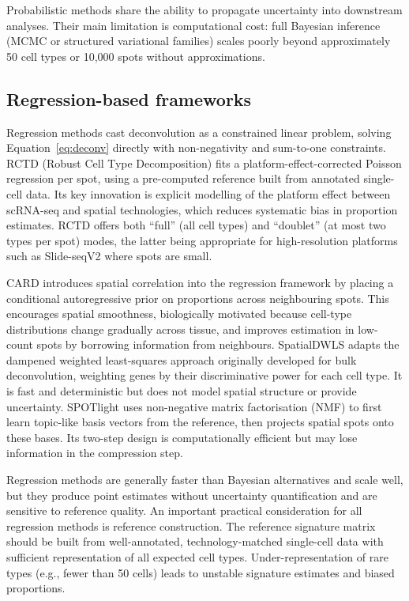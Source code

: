 Probabilistic methods share the ability to propagate uncertainty into downstream analyses. Their main limitation is computational cost: full Bayesian inference (MCMC or structured variational families) scales poorly beyond approximately 50 cell types or 10,000 spots without approximations.

\subsection{Regression-based frameworks}

Regression methods cast deconvolution as a constrained linear problem, solving Equation~\ref{eq:deconv} directly with non-negativity and sum-to-one constraints. RCTD (Robust Cell Type Decomposition) \citep{cable2022robust} fits a platform-effect-corrected Poisson regression per spot, using a pre-computed reference built from annotated single-cell data. Its key innovation is explicit modelling of the platform effect between scRNA-seq and spatial technologies, which reduces systematic bias in proportion estimates. RCTD offers both ``full'' (all cell types) and ``doublet'' (at most two types per spot) modes, the latter being appropriate for high-resolution platforms such as Slide-seqV2 where spots are small.

CARD \citep{ma2022card} introduces spatial correlation into the regression framework by placing a conditional autoregressive prior on proportions across neighbouring spots. This encourages spatial smoothness, biologically motivated because cell-type distributions change gradually across tissue, and improves estimation in low-count spots by borrowing information from neighbours. SpatialDWLS \citep{dong2021spatialdwls} adapts the dampened weighted least-squares approach originally developed for bulk deconvolution, weighting genes by their discriminative power for each cell type. It is fast and deterministic but does not model spatial structure or provide uncertainty. SPOTlight \citep{elosua2021spotlight} uses non-negative matrix factorisation (NMF) to first learn topic-like basis vectors from the reference, then projects spatial spots onto these bases. Its two-step design is computationally efficient but may lose information in the compression step.

Regression methods are generally faster than Bayesian alternatives and scale well, but they produce point estimates without uncertainty quantification and are sensitive to reference quality. An important practical consideration for all regression methods is reference construction. The reference signature matrix should be built from well-annotated, technology-matched single-cell data with sufficient representation of all expected cell types. Under-representation of rare types (e.g., fewer than 50 cells) leads to unstable signature estimates and biased proportions.

